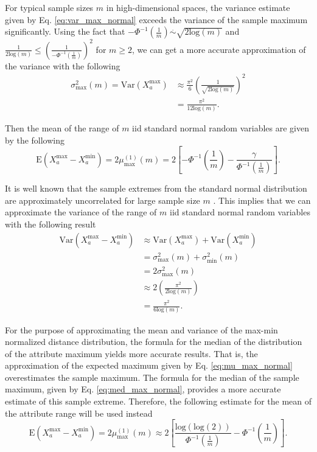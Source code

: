\documentclass[10pt,letterpaper]{article}\usepackage[]{graphicx}\usepackage[]{color}
\begin{document}
For typical sample sizes $m$ in high-dimensional spaces, the variance estimate given by Eq. \ref{eq:var_max_normal} exceeds the variance of the sample maximum significantly. Using the fact that $-\Phi^{-1}\left(\frac{1}{m}\right) \overset{.}{\sim} \sqrt{2 \text{log}(m)}$ \cite{cramer1999} and $\frac{1}{2 \text{log}(m)} \leq \left(\frac{1}{-\Phi^{-1}\left(\frac{1}{m}\right)}\right)^2$ for $m \geq 2$, we can get a more accurate approximation of the variance with the following
%
\begin{equation}\label{eq:var_max_normal_improved}
\begin{aligned}
\sigma^2_\text{max}(m) = \text{Var}(X^\text{max}_a) &\approx \frac{\pi^2}{6}\left(\frac{1}{\sqrt{2\text{log}(m)}}\right)^2 \\
&= \frac{\pi^2}{12\text{log}(m)}.
\end{aligned}
\end{equation}

Then the mean of the range of $m$ iid standard normal random variables are given by the following
%
\begin{equation}\label{eq:mu_rng_normal}
\text{E}(X^\text{max}_a - X^\text{min}_a) = 2\mu^{(1)}_\text{max}(m) = 2\left[-\Phi^{-1} \left(\frac{1}{m}\right) - \frac{\gamma}{\Phi^{-1}\left(\frac{1}{m}\right)}\right].
\end{equation}

It is well known that the sample extremes from the standard normal distribution are approximately uncorrelated for large sample size $m$ \cite{gumbel1947}. This implies that we can approximate the variance of the range of $m$ iid standard normal random variables with the following result
%
\begin{equation}\label{eq:var_rng_normal}
\begin{aligned}
\text{Var}(X^\text{max}_a - X^\text{min}_a) &\approx \text{Var}(X^\text{max}_a) + \text{Var}(X^\text{min}_a) \\
&= \sigma^2_\text{max}(m) + \sigma^2_\text{min}(m) \\
&= 2\sigma^2_\text{max}(m) \\
&\approx 2\left(\frac{\pi^2}{2\text{log}(m)}\right) \\
&= \frac{\pi^2}{6\text{log}(m)}.
\end{aligned}
\end{equation}

For the purpose of approximating the mean and variance of the max-min normalized distance distribution, the formula for the median of the distribution of the attribute maximum yields more accurate results. That is, the approximation of the expected maximum given by Eq. \ref{eq:mu_max_normal} overestimates the sample maximum. The formula for the median of the sample maximum, given by Eq. \ref{eq:med_max_normal}, provides a more accurate estimate of this sample extreme. Therefore, the following estimate for the mean of the attribute range will be used instead
%
\begin{equation}\label{eq:mu_rng_normal_improved}
\text{E}(X^\text{max}_a - X^\text{min}_a) = 2\mu^{(1)}_\text{max}(m) \approx 2\left[\frac{\text{log}(\text{log}(2))}{\Phi^{-1}\left(\frac{1}{m}\right)} - \Phi^{-1}\left(\frac{1}{m}\right)\right].
\end{equation}
\end{document}
